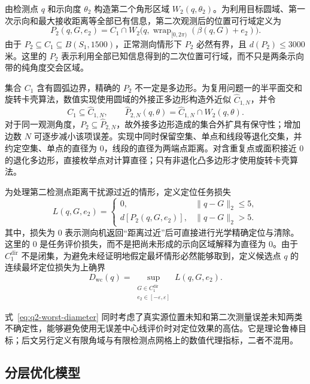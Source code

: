 由检测点 $q$ 和示向度 $\theta_2$ 构造第二个角形区域 $W_2(q,\theta_2)$。为利用目标圆域、第一次示向和最大接收距离等全部已有信息，第二次观测后的位置可行域定义为
\begin{equation}
  P_2(q,G,e_2)
  =C_1\cap W_2\bigl(q,\operatorname{wrap}_{[0,2\pi)}(\beta(q,G)+e_2)\bigr).
  \label{eq:q2-second-polygon}
\end{equation}
由于 $P_2\subseteq C_1\subseteq B(S_1,1500)$，正常测向情形下 $P_2$ 必然有界，且 $d(P_2)\leq3000$ 米。这里的 $P_2$ 表示利用全部已知信息得到的二次位置可行域，而不只是两条示向带的纯角度交会区域。

集合 $C_1$ 含有圆弧边界，精确的 $P_2$ 不一定是多边形。为复用问题一的半平面交和旋转卡壳算法，数值实现使用圆域的外接正多边形构造外近似 $\widehat C_{1,N}$，并令
\[
  C_1\subseteq\widehat C_{1,N},
  \qquad
  \widehat P_{2,N}(q,\theta)
  =\widehat C_{1,N}\cap W_2(q,\theta).
\]
对于同一观测角度，$P_2\subseteq\widehat P_{2,N}$，故外接多边形造成的集合外扩具有保守性；增加边数 $N$ 可逐步减小该项误差。实现中同时保留空集、单点和线段等退化交集，并约定空集、单点的直径为 $0$，线段的直径为两端点距离。对含重复点或面积接近 $0$ 的退化多边形，直接枚举点对计算直径；只有非退化凸多边形才使用旋转卡壳算法。

为处理第二检测点距离干扰源过近的情形，定义定位任务损失
\[
  L(q,G,e_2)=
  \begin{cases}
    0,
    & \|q-G\|_2\leq 5,\\
    d\left[P_2(q,G,e_2)\right],
    & \|q-G\|_2>5.
  \end{cases}
\]
其中，损失为 $0$ 表示测向机返回“距离过近”后可直接进行光学精确定位与清除。这里的 $0$ 是任务评价损失，而不是把尚未形成的示向区域解释为直径为 $0$。由于 $C_1^{\mathrm{dir}}$ 不是闭集，为避免未经证明地假定最坏情形必然能够取到，定义候选点 $q$ 的连续最坏定位损失为上确界
\begin{equation}
  D_{\mathrm{wc}}(q)
  =\sup_{\substack{G\in C_1^{\mathrm{dir}}\\e_2\in[-\varepsilon,\varepsilon]}}
  L(q,G,e_2).
  \label{eq:q2-worst-diameter}
\end{equation}

式~\eqref{eq:q2-worst-diameter} 同时考虑了真实源位置未知和第二次测量误差未知两类不确定性，能够避免使用无误差中心线评价时对定位效果的高估。它是理论鲁棒目标；后文另行定义有限角域与有限检测点网格上的数值代理指标，二者不混用。

\subsection{分层优化模型}

